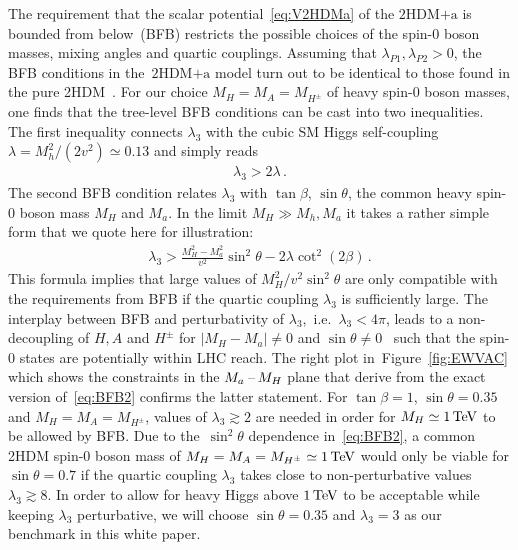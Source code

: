 \documentclass[a4paper, 11pt,notoc]{article}
\newcommand{\hdma}{\ensuremath{\textrm{2HDM+a}}\xspace}
\begin{document}
The requirement that the scalar potential~\eqref{eq:V2HDMa} of the \hdma  is bounded from below~(BFB) restricts the possible choices of the spin-0 boson masses, mixing angles and quartic couplings. Assuming that $\lambda_{P1}, \lambda_{P2} > 0$, the  BFB conditions in the~\hdma model turn out to be identical to those found in the pure 2HDM~\cite{Gunion:2002zf}. For our choice $M_H = M_A = M_{H^\pm}$ of heavy spin-0 boson masses, one finds that the tree-level BFB conditions can be cast into  two inequalities. The first inequality connects $\lambda_3$ with the cubic SM Higgs self-coupling $\lambda = M_h^2/(2 v^2) \simeq 0.13$ and simply reads   
\begin{align} \label{eq:BFB1}
\lambda_3 > 2 \lambda  \,.
\end{align}
The second BFB condition relates $\lambda_3$ with $\tan \beta$, $\sin \theta$, the common heavy  spin-0 boson  mass $M_H$ and $M_a$. In the limit $M_H \gg M_h, M_a$ it takes a rather simple form that we quote here for illustration: 
\begin{align} \label{eq:BFB2}
\lambda_3 > \frac{M_H^2 -M_a^2}{v^2} \sin^2 \theta  - 2 \lambda \cot^2 (2 \beta )  \,.
\end{align}
This formula implies that large values of $M_H^2/v^2 \sin^2 \theta$ are only compatible with the requirements from BFB if the quartic coupling $\lambda_3$ is sufficiently large.  The interplay between BFB and perturbativity of $\lambda_3$,~i.e.~$\lambda_3 < 4 \pi$, leads to a non-decoupling of $H, A$ and $H^\pm$ for $|M_H - M_a| \neq 0$ and $\sin \theta  \neq 0$~\cite{Goncalves:2016iyg} such that the spin-0 states are potentially within LHC reach. The right plot in~Figure~\ref{fig:EWVAC} which shows the constraints in the $M_{a}\hspace{0.5mm}$--$\hspace{0.5mm} M_H$ plane that derive from the exact version of~\eqref{eq:BFB2} confirms the latter statement. For $\tan \beta = 1$, $\sin \theta = 0.35$ and $M_H = M_A = M_{H^\pm}$, values of $\lambda_3 \gtrsim 2$ are needed in order for $M_H \simeq 1 \, {\rm TeV}$ to be allowed by BFB.  Due to the~$\sin^2 \theta$ dependence in~\eqref{eq:BFB2},   a common 2HDM  spin-0 boson  mass of $M_H = M_A = M_{H^\pm} \simeq 1 \, {\rm TeV}$ would only be viable for $\sin \theta = 0.7$ if the quartic coupling $\lambda_3$ takes close to non-perturbative values $\lambda_3 \gtrsim 8$. In order to allow for heavy Higgs above $1 \, {\rm TeV}$ to be acceptable while keeping $\lambda_3$ perturbative, we will choose $\sin \theta = 0.35$ and $\lambda_3 = 3$ as our benchmark in this white paper.  
\end{document}
